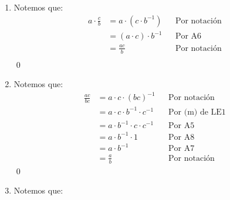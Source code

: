 \documentclass[11pt]{article}
\begin{document}
\begin{enumerate}[label=\alph*),font=\bfseries]


\item Notemos que:
\begin{align*}
    a \cdot \frac{c}{b} &= a \cdot \left( c \cdot b^{-1} \right) && \text{Por notación}\\
    &= \left( a \cdot c \right) \cdot b^{-1} && \text{Por A6}\\
    &= \frac{ac}{b} && \text{Por notación}\\
\end{align*}
\qed


\item Notemos que:
\begin{align*}
    \frac{ac}{bc} &= a \cdot c \cdot \left( bc \right)^{-1} && \text{Por notación}\\
    &= a \cdot c \cdot b^{-1} \cdot c^{-1} && \text{Por (m) de LE1}\\
    &= a \cdot b^{-1} \cdot c \cdot c^{-1} && \text{Por A5}\\
    &= a \cdot b^{-1} \cdot 1 && \text{Por A8}\\
    &= a \cdot b^{-1} && \text{Por A7}\\
    &= \frac{a}{b} && \text{Por notación}
\end{align*}
\qed


\item Notemos que:


\end{enumerate}
\end{document}
